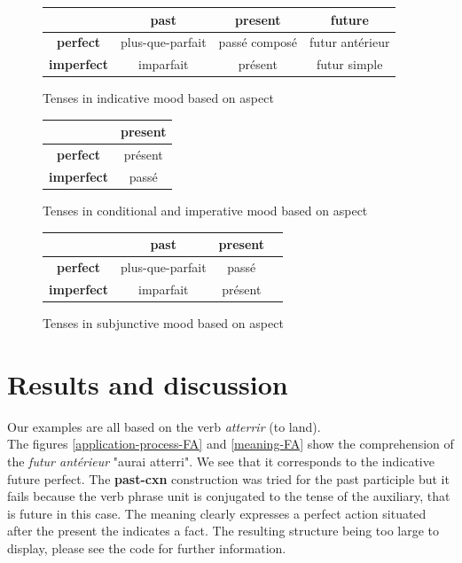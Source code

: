 \documentclass[a4paper,10pt]{article}
\begin{document}
\begin{figure}[!h]
    \centering
    \begin{tabular}{c|c|c|c}
        & \textbf{past} & \textbf{present} & \textbf{future} \\\hline
        \textbf{perfect} & plus-que-parfait & passé composé & futur antérieur \\\hline
        \textbf{imperfect} & imparfait & présent & futur simple \\    
    \end{tabular}
    \caption{Tenses in indicative mood based on aspect}
    \label{indicativetenses}
\end{figure}

\begin{figure}[!h]
    \centering
    \begin{tabular}{c|c}
        & \textbf{present} \\\hline
        \textbf{perfect} & présent \\\hline
        \textbf{imperfect} & passé \\    
    \end{tabular}
    \caption{Tenses in conditional and imperative mood based on aspect}
    \label{conditionaltenses}
\end{figure}

\begin{figure}[!h]
    \centering
    \begin{tabular}{c|c|c|c}
        & \textbf{past} & \textbf{present} \\\hline
        \textbf{perfect} & plus-que-parfait & passé \\\hline
        \textbf{imperfect} & imparfait & présent \\    
    \end{tabular}
    \caption{Tenses in subjunctive mood based on aspect}
    \label{subjunctivetenses}
\end{figure}

\section{Results and discussion}

Our examples are all based on the verb \textit{atterrir} (to land). \\

The figures \ref{application-process-FA} and \ref{meaning-FA} show the comprehension of the \textit{futur antérieur} "aurai atterri". We see that it corresponds to the indicative future perfect. The \textbf{past-cxn} construction was tried for the past participle but it fails because the verb phrase unit is conjugated to the tense of the auxiliary, that is future in this case. The meaning clearly expresses a perfect action situated after the present the indicates a fact. The resulting structure being too large to display, please see the code for further information. \\
\end{document}
